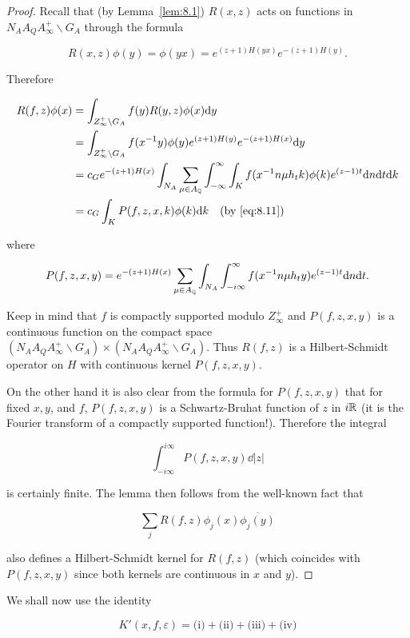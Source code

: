 \begin{proof}

Recall that (by Lemma~\ref{lem:8.1}) $R(x,z)$ acts on functions in $N_A A_Q A_\infty^{+} \backslash G_A$ through the formula

\[
R(x, z)\phi(y) = \phi(yx) = e^{(z+1)H(yx)}e^{-(z+1)H(y)}.
\]

Therefore

\[
\begin{aligned}
R(f, z)\phi(x) &= \int_{Z_\infty^{+} \backslash G_A} f(y)R(y, z)\phi(x)\mathrm{d} y\\
&= \int_{Z_\infty^{+} \backslash G_A} f(x^{-1}y)\phi(y)e^{(z+1)H(y)}e^{-(z+1)H(x)}\mathrm{d} y\\
&= c_Ge^{-(z+1)H(x)}\int_{N_A}\sum_{\mu \in A_{\mathbb{Q}}}\int_{-\infty}^{\infty}\int_K f(x^{-1}n\mu h_tk)\phi(k)e^{(z-1)t}\mathrm{d} n\mathrm{d} t\mathrm{d} k\\
&= c_G\int_K P(f, z, x, k)\phi(k)\mathrm{d} k \quad \text{(by \eqref{eq:8.11})}
\end{aligned}
\]

where

\[
P(f, z, x, y) = e^{-(z+1)H(x)}\sum_{\mu \in A_{\mathbb{Q}}}\int_{N_A}\int_{-i\infty}^{\infty} f(x^{-1}n\mu h_ty)e^{(z-1)t}\mathrm{d} n\mathrm{d} t.
\]

Keep in mind that $f$ is compactly supported modulo $Z_\infty^{+}$ and $P(f,z,x,y)$ is a continuous function on the compact space $(N_A A_Q A_\infty^{+} \backslash G_A) \times (N_A A_Q A_\infty^{+} \backslash G_A)$. Thus $R(f,z)$ is a Hilbert-Schmidt operator on $H$ with continuous kernel $P(f,z,x,y)$.

On the other hand it is also clear from the formula for $P(f, z, x, y)$ that for fixed $x, y$, and $f$, $P(f, z, x, y)$ is a Schwartz-Bruhat function of $z$ in $i\mathbb{R}$ (it is the Fourier transform of a compactly supported function!). Therefore the integral

\[
\int_{-i\infty}^{i\infty}P(f, z, x, y)\dd|z|
\]

is certainly finite. The lemma then follows from the well-known fact that

\[
\sum_j R(f, z)\phi_j(x)\overline{\phi_j(y)}
\]

also defines a Hilbert-Schmidt kernel for $R(f, z)$ (which coincides with $P(f, z, x, y)$ since both kernels are continuous in $x$ and $y$).

\end{proof}

We shall now use the identity

\[
K'(x, f, \varepsilon) = \text{(i)} + \text{(ii)} + \text{(iii)} + \text{(iv)}
\]


